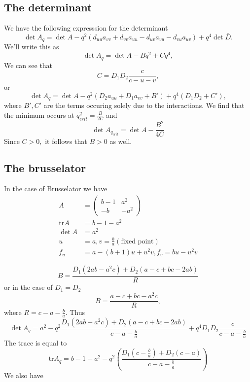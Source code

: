 \documentclass{article}
\newcommand{\tr}{\text{tr}}
\begin{document}
\subsection{The determinant}
We have the following expresssion for the determinant
\begin{equation}
\det A_q = \det A - q^2(d_{uu}a_{vv}+d_{vv}a_{uu}-d_{uv}a_{vu}-d_{vu}a_{uv})+q^4 \det \bar{D}.
\end{equation}
We'll write this as
\begin{equation}
\det A_q = \det A - Bq^2 + C q^4,
\end{equation}
We can see that
\begin{equation}
C = D_1D_2\frac{c}{c-u-v},
\end{equation}
or
\begin{equation}
\det A_q = \det A - q^2(D_{2}a_{uu}+D_1a_{vv} + B') + q^4 (D_1 D_2 + C'),
\end{equation}
where $B',C'$ are the terms occuring solely due to the interactions.
We find that the minimum occurs at $q_{crit}^2 = \frac {B}{2C}$ and
\begin{equation}
\det A_{q_{crit}} = \det A - \frac{B^2}{4C}
\end{equation}
Since $C>0,$ it follows that $B>0$ as well.

\subsection{The brusselator}
In the case of Brusselator we have
\begin{align}
A&=\begin{pmatrix}b-1& a^2 \\ -b &-a^2\end{pmatrix}\\
\tr A &= b-1-a^2\\
\det A&= a^2\\
u&=a,v=\frac{b}{a} (\text{fixed point})\\
f_u &= a-(b+1)u+u^2v, f_v = bu-u^2v
\end{align}

\begin{equation}
B=\frac{D_1(2ab-a^2c)+D_2(a-c+bc-2ab)}{R}
\end{equation} or in the case of $D_1 = D_2$
\begin{equation}
B = \frac{a-c+bc-a^2c}{R},
\end{equation}
where $R = c-a-\frac ba$.
Thus
\begin{equation}
\det A_q = a^2 - q^2\frac{D_1(2ab-a^2c)+D_2(a-c+bc-2ab)}{c-a-\frac{b}{a}}+q^4 D_1D_2\frac{c}{c-a-\frac{b}{a}}
\end{equation}
The trace is equal to
\begin{equation}
\tr A_q = b-1-a^2 - q^2 (\frac{D_1(c-\frac{b}{a})+D_2(c-a)}{c-a-\frac{b}{a}})
\end{equation}
We also have 
\end{document}
